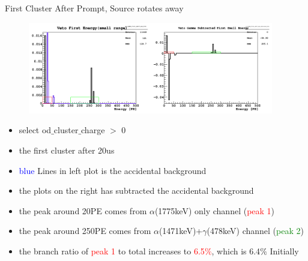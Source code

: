 \documentclass[9pt]{beamer}
\begin{document}
\begin{frame}{First Cluster After Prompt, Source rotates away}
\begin{figure}
\includegraphics[height= 4cm, width=\textwidth]{nv_gamma_first_small_ene_subtracted_away_Feb7PM.png}
\end{figure}
\begin{itemize}
[bullet]
\item select od$\_$cluster$\_$charge $>$ 0
\item the first cluster after 20us
\item \textcolor{blue}{blue} Lines in left plot is the accidental background 
\item the plots on the right has subtracted the accidental background 
\item the peak around 20PE comes from $\alpha$(1775keV) only channel (\textcolor{red}{peak 1})
\item the peak around 250PE comes from $\alpha$(1471keV)+$\gamma$(478keV) channel (\textcolor{green}{peak 2})
\item the branch ratio of \textcolor{red}{peak 1} to total increases to \textcolor{red}{6.5$\%$}, which is 6.4$\%$ Initially 
\end{itemize}
\end{frame}
\end{document}
